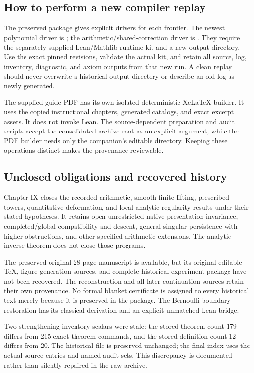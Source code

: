\subsection{How to perform a new compiler replay}
The preserved package gives explicit drivers for each frontier. The newest polynomial driver is ; the arithmetic/shared-correction driver is . They require the separately supplied Lean/Mathlib runtime kit and a new output directory. Use the exact pinned revisions, validate the actual kit, and retain all source, log, inventory, diagnostic, and axiom outputs from that new run. A clean replay should never overwrite a historical output directory or describe an old log as newly generated.

The supplied guide PDF has its own isolated deterministic XeLaTeX builder. It uses the copied instructional chapters, generated catalogs, and exact excerpt assets. It does not invoke Lean. The source-dependent preparation and audit scripts accept the consolidated archive root as an explicit argument, while the PDF builder needs only the companion's editable directory. Keeping these operations distinct makes the provenance reviewable.

\subsection{Unclosed obligations and recovered history}
Chapter IX closes the recorded arithmetic, smooth finite lifting, prescribed towers, quantitative deformation, and local analytic regularity results under their stated hypotheses. It retains open unrestricted native presentation invariance, completed/global compatibility and descent, general singular persistence with higher obstructions, and other specified arithmetic extensions. The analytic inverse theorem does not close those programs.

The preserved original 28-page manuscript is available, but its original editable TeX, figure-generation sources, and complete historical experiment package have not been recovered. The reconstruction and all later continuation sources retain their own provenance. No formal blanket certificate is assigned to every historical text merely because it is preserved in the package. The Bernoulli boundary restoration has its classical derivation and an explicit unmatched Lean bridge.

Two strengthening inventory scalars were stale: the stored theorem count 179 differs from 215 exact theorem commands, and the stored definition count 12 differs from 20. The historical file is preserved unchanged; the final index uses the actual source entries and named audit sets. This discrepancy is documented rather than silently repaired in the raw archive.
